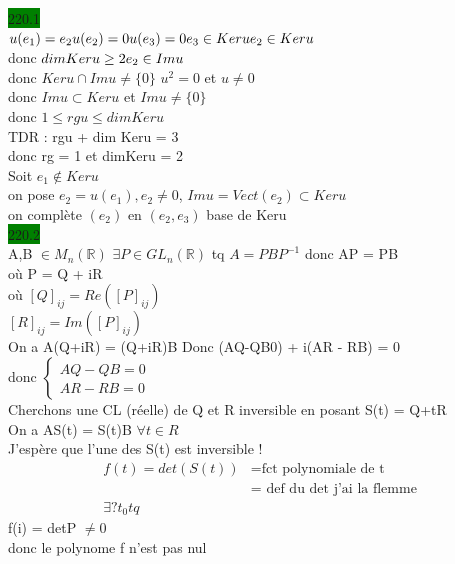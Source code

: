 \documentclass{article}
\begin{document}
\noindent \colorbox{green}{220.1}\\
\(u(e_1) = e_2\\
u(e_2) = 0\\
u(e_3) = 0\\
e_3 \in Ker u\\
e_2 \in Ker u\)\\
donc \(dim Keru \geq 2\\
e_2 \in Imu\)\\
donc \(Keru \cap Imu \neq \{0\}\)
\(u^2 = 0\) et \(u \neq 0\)\\
donc \(Imu \subset Keru\) et \(Imu \neq \{0\}\)\\
donc \(1 \leq rgu \leq dimKeru\)\\
TDR : rgu + dim Keru = 3\\
donc rg = 1 et dimKeru = 2\\
Soit \(e_1 \notin Ker u\)\\
on pose \(e_2 = u(e_1), e_2 \neq 0\), \(Im u = Vect(e_2) \subset Keru\)\\
on complète \((e_2)\) en \((e_2, e_3)\) base de Keru\\

\noindent \colorbox{green}{220.2}\\
A,B \(\in M_n(\mathbb{R})\)
\(\exists P \in GL_n(\mathbb{R})\) tq \(A = PBP^{-1}\) donc AP = PB\\
où P = Q + iR\\
où \([Q]_{ij} = Re([P]_{ij})\)\\
\([R]_{ij} = Im([P]_{ij})\)\\
On a A(Q+iR) = (Q+iR)B
Donc (AQ-QB0) + i(AR - RB) = 0\\
donc \(\begin{cases}
    AQ-QB = 0\\
    AR-RB = 0
\end{cases}\)\\
Cherchons une CL (réelle) de Q et R inversible en posant 
S(t) = Q+tR\\
On a AS(t) = S(t)B \(\forall t \in R\)\\
J'espère que l'une des S(t) est inversible ! 
\begin{align*}
    f(t) = det(S(t))
    &= \text{fct polynomiale de t}\\
    &= \text{ def du det j'ai la flemme}\\
    \exists ? t_0 tq 
\end{align*}
f(i) = detP \(\neq 0\)\\
donc le polynome f n'est pas nul\\
\end{document}
